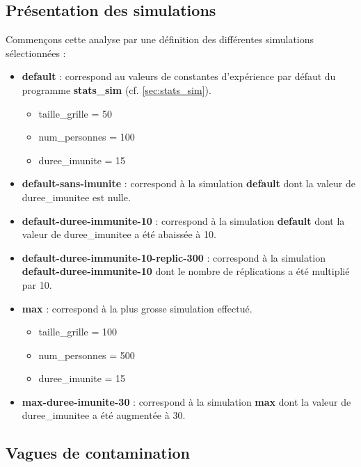 \documentclass[12pt,french,titlepage]{article}
\begin{document}
\subsection{Présentation des simulations}
Commençons cette analyse par une définition des différentes simulations sélectionnées :
\begin{itemize}
\item \textbf{default} : correspond au valeurs de constantes d'expérience par défaut du programme \textbf{stats\_sim} (cf. \ref{sec:stats_sim}).
\begin{itemize}
\item taille\_grille = 50
\item num\_personnes = 100
\item duree\_imunite = 15
\end{itemize}

\item \textbf{default-sans-imunite} : correspond à la simulation \textbf{default} dont la valeur de duree\_imunitee est nulle.


\item \textbf{default-duree-immunite-10} : correspond à la simulation \textbf{default} dont la valeur de duree\_imunitee a été abaissée à 10.

\item \textbf{default-duree-immunite-10-replic-300} : correspond à la simulation \textbf{default-duree-immunite-10} dont le nombre de réplications a été multiplié par 10.\\


\item \textbf{max} : correspond à la plus grosse simulation effectué.
\begin{itemize}
\item taille\_grille = 100
\item num\_personnes = 500
\item duree\_imunite = 15
\end{itemize}

\item \textbf{max-duree-imunite-30} : correspond à la simulation \textbf{max} dont la valeur de duree\_imunitee a été augmentée à 30.

\end{itemize}

\newpage

\subsection{Vagues de contamination}
\end{document}
